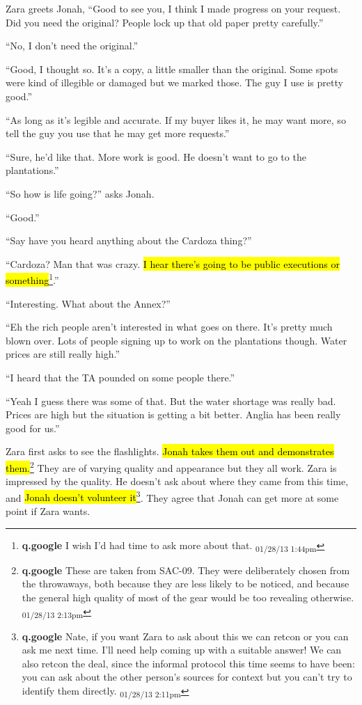 Zara greets Jonah, ``Good to see you, I think I made progress on your request.  Did you need the original?  People lock up that old paper pretty carefully.''

``No, I don't need the original.''

``Good, I thought so.  It's a copy, a little smaller than the original.  Some spots were kind of illegible or damaged but we marked those.  The guy I use is pretty good.''

``As long as it's legible and accurate.  If my buyer likes it, he may want more, so tell the guy you use that he may get more requests.''

``Sure, he'd like that.  More work is good.  He doesn't want to go to the plantations.''



``So how is life going?'' asks Jonah.

``Good.''

``Say have you heard anything about the Cardoza thing?''

``Cardoza?  Man that was crazy.  \hl{I hear there's going to be public executions or something}\footnote{\textbf{q.google }I wish I'd had time to ask more about that. \textsubscript{01/28/13 1:44pm}}.''

``Interesting.  What about the Annex?''

``Eh the rich people aren't interested in what goes on there.  It's pretty much blown over.  Lots of people signing up to work on the plantations though.  Water prices are still really high.''

``I heard that the TA pounded on some people there.''

``Yeah I guess there was some of that.  But the water shortage was really bad.  Prices are high but the situation is getting a bit better.  Anglia has been really good for us.''



Zara first asks to see the flashlights.  \hl{Jonah takes them out and demonstrates them.}\footnote{\textbf{q.google }These are taken from SAC-09.  They were deliberately chosen from the throwaways, both because they are less likely to be noticed, and because the general high quality of most of the gear would be too revealing otherwise. \textsubscript{01/28/13 2:13pm}}  They are of varying quality and appearance but they all work.  Zara is impressed by the quality.   He doesn't ask about where they came from this time, and \hl{Jonah doesn't volunteer it}\footnote{\textbf{q.google }Nate, if you want Zara to ask about this we can retcon or you can ask me next time.  I'll need help coming up with a suitable answer!  We can also retcon the deal, since the informal protocol this time seems to have been: you can ask about the other person's sources for context but you can't try to identify them directly. \textsubscript{01/28/13 2:11pm}}.  They agree that Jonah can get more at some point if Zara wants.



